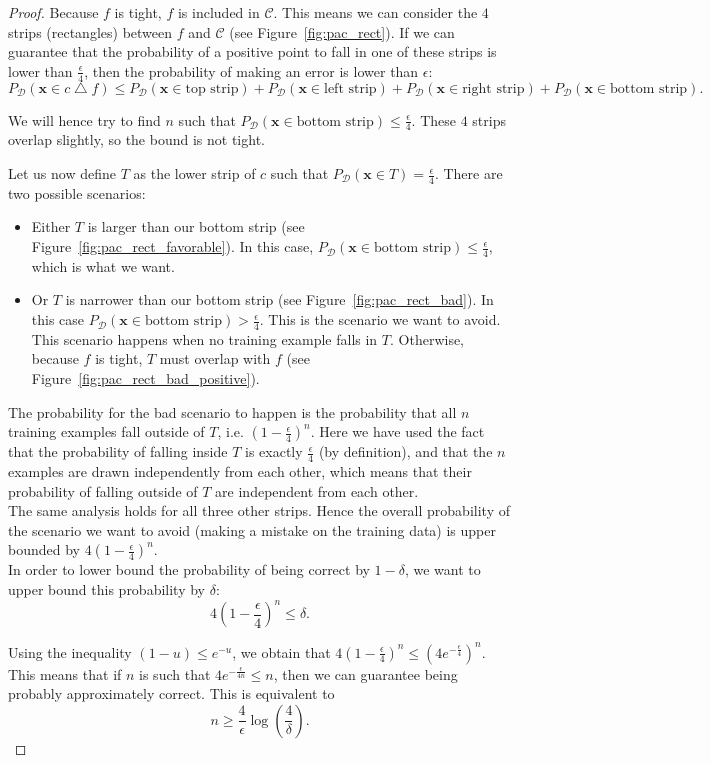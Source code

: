\documentclass[a4paper,12pt]{article}
\newcommand{\cc}{\mathcal{C}}
\newcommand{\dd}{\mathcal{D}}
\newcommand{\xx}{{\bm x}}
\begin{document}
\begin{proof} 
Because $f$ is tight, $f$ is included in $\cc$. This means we can consider the $4$ strips (rectangles) between $f$ and $\cc$ (see Figure~\ref{fig:pac_rect}). If we can guarantee that the probability of a positive point to fall in one of these strips is lower than $\frac{\epsilon}{4}$, then the probability of making an error is lower than $\epsilon$: 
\[
P_{\dd}(\xx \in c \bigtriangleup f) \leq  P_{\dd}(\xx \in \mbox{top strip}) +
P_{\dd}(\xx \in \mbox{left strip}) + P_{\dd}(\xx \in \mbox{right strip}) +
P_{\dd}(\xx \in \mbox{bottom strip}).
\]

We will hence try to find $n$ such that $P_{\dd}(\xx \in \mbox{bottom strip}) 
\leq \frac{\epsilon}{4}.$
These $4$ strips overlap slightly, so the bound is not tight.

Let us now define $T$ as the lower strip of $c$ such that 
$P_{\dd}(\xx \in T) = \frac{\epsilon}{4}$. There are two possible scenarios:
\begin{itemize}
\item Either $T$ is larger than our bottom strip (see Figure~\ref{fig:pac_rect_favorable}). In this case, $P_{\dd}(\xx \in \mbox{bottom strip}) \leq \frac{\epsilon}{4}$, which is what we want.
\item Or $T$ is narrower than our bottom strip (see Figure~\ref{fig:pac_rect_bad}). In this case $P_{\dd}(\xx \in \mbox{bottom strip}) > \frac{\epsilon}{4}$. This is the scenario we want to avoid. This scenario happens when no training example falls in $T$. Otherwise, because $f$ is tight, $T$ must overlap with $f$ (see Figure~\ref{fig:pac_rect_bad_positive}).
\end{itemize}

The probability for the bad scenario to happen is the probability that all $n$ training examples fall outside of $T$, i.e. 
$\left( 1 - \frac{\epsilon}{4}\right)^n$.
Here we have used the fact that the probability of falling inside $T$ is exactly $\frac{\epsilon}{4}$ (by definition), and that the $n$ examples are drawn independently from each other, which means that their probability of falling outside of $T$ are independent from each other.\\

The same analysis holds for all three other strips. Hence the overall probability of the scenario we want to avoid (making a mistake on the training data) is upper bounded by $4 \left( 1 - \frac{\epsilon}{4}\right)^n$.\\

In order to lower bound the probability of being correct by $1-\delta$, we want to upper bound this probability by $\delta$:
\[
4 \left( 1 - \frac{\epsilon}{4}\right)^n \leq \delta.
\]

Using the inequality $(1-u) \leq e^{-u}$, we obtain that $4 \left( 1 - \frac{\epsilon}{4}\right)^n \leq \left(4 e^{-\frac{\epsilon}{4}}\right)^n$. This means that if $n$ is such that $4 e^{-\frac{\epsilon}{4n}} \leq n$, then we can guarantee being probably approximately correct. This is equivalent to 
\[
n \geq \frac{4}{\epsilon} \log\left( \frac{4}{\delta} \right).
\]
\end{proof}
\end{document}

